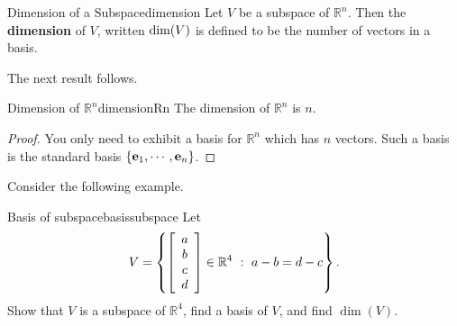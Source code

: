 \begin{definition}{Dimension of a Subspace}{dimension}
Let $V$ be a subspace of $\mathbb{R}^{n}$. Then the \textbf{dimension }of $V$, written $\mbox{dim}(V)$
is defined to be the number of vectors in a basis.
\end{definition}

The next result follows.

\begin{corollary}{Dimension of $\mathbb{R}^n$}{dimensionRn}
The dimension of $\mathbb{R}^{n}$ is $n.$ 
\end{corollary}

\begin{proof}
You only need to exhibit a basis for $\mathbb{R}^{n}$ which
has $n$ vectors. Such a basis is the standard basis $\left\{ {\bf e}_{1},\cdots , {\bf e}_{n}\right\} $.
\end{proof}

Consider the following example.

\begin{example}{Basis of subspace}{basissubspace}
Let 
\[ V=\left\{
\left[\begin{array}{c} a\\ b\\ c\\ d\end{array}\right]\in\mathbb{R}^4
~:~ a-b=d-c \right\}.\]
Show that $V$ is a subspace of $\mathbb{R}^4$,
find a basis of $V$, and find $\dim(V)$.
\end{example}


